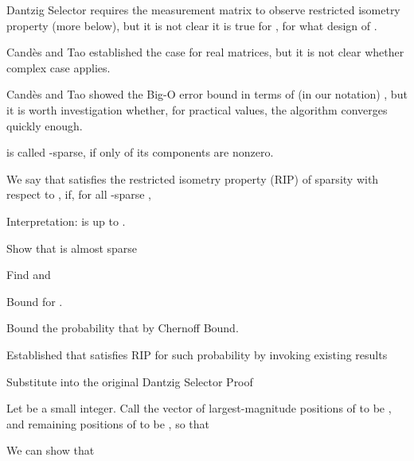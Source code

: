 {
\I Dantzig Selector requires the measurement matrix to observe restricted isometry property (more below), but it is not clear it is true for , for what design of .

\I Cand\`es and Tao established the case for real matrices, but it is not clear whether complex case applies.

\I Cand\`es and Tao showed the Big-O error bound in terms of (in our notation) , but it is worth investigation whether, for practical values, the algorithm converges quickly enough.
}

{
\I {} is called -sparse, if only  of its components are nonzero.

\I We say that \m {\M{\Phi}} satisfies the restricted isometry property (RIP) of sparsity  with respect to , if, for all -sparse ,

\I Interpretation: \m {\M{\Phi}} is  up to  .
}
{
\I Show that  is almost sparse

\I Find  and 

\I Bound  for .

\I Bound the probability that  by Chernoff Bound.

\I Established that  satisfies RIP for such probability by invoking existing results

\I Substitute  into the original Dantzig Selector Proof
}
{
\I Let  be a small integer.
Call the vector of largest-magnitude  positions of  to be , and remaining positions of  to be , so that 

\I We can show that 
}
